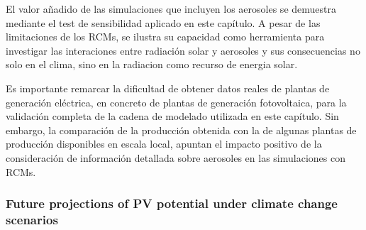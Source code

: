 El valor añadido de las simulaciones que incluyen los aerosoles se demuestra mediante el test de sensibilidad aplicado en este capítulo. A pesar de las limitaciones de los RCMs, se ilustra su capacidad como herramienta para investigar las interaciones entre radiación solar y aerosoles y sus consecuencias no solo en el clima, sino en la radiacion como recurso de energia solar.


Es importante remarcar la dificultad de obtener datos reales de plantas de generación eléctrica, en concreto de plantas de generación fotovoltaica, para la validación completa de la cadena de modelado utilizada en este capítulo. Sin embargo, la comparación de la producción obtenida con la de algunas plantas de producción disponibles en escala local, apuntan el impacto positivo de la consideración de información detallada sobre aerosoles en las simulaciones con RCMs. 




\subsubsection{Future projections of PV potential under climate change scenarios}

